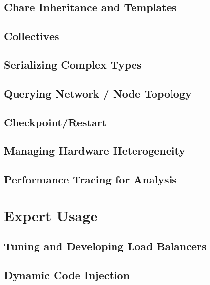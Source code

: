 \documentclass[10pt]{report}
\begin{document}
\chapter{Chare Inheritance and Templates}
\label{inheritance and templates}
  

\chapter{Collectives}
  
  

\chapter{Serializing Complex Types}
  

\chapter{Querying Network / Node Topology}
\label{topo}
  

\chapter{Checkpoint/Restart}
\label{sec:checkpoint}
  

\chapter{Managing Hardware Heterogeneity}
\label{sec:hetero}
  

\chapter{Performance Tracing for Analysis}
\label{sec:trace-projections}
  


\part{Expert Usage}

\chapter{Tuning and Developing Load Balancers}
\label{advancedlb}
  

\chapter{Dynamic Code Injection}
\label{python}
  
\end{document}
